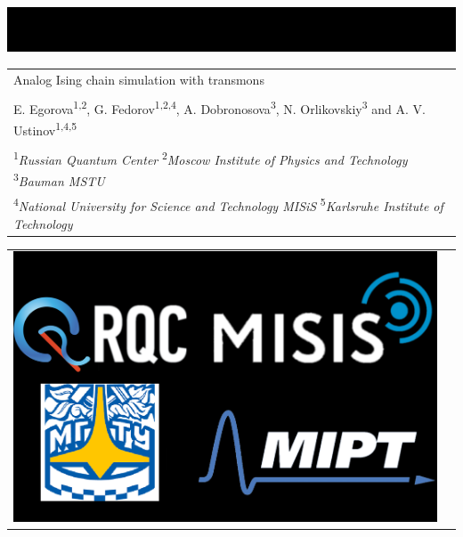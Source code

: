 \documentclass[a0, portrait]{a0poster}
\begin{document}
\begin{center}
\vspace*{-2cm}
\hspace*{-2cm}\includegraphics[width=1.2\textwidth]{Black_Landscape}
\end{center}


\begin{minipage}{0.65\textwidth}					
\vspace{-11cm}
\begin{tabular}[t]{l}
{\color{headingcol}\fontsize{68}{70}\selectfont Analog Ising chain simulation with transmons}\\
\\
{\hspace{0.2cm} \color{white}\large  E. Egorova\textsuperscript{1,2}, G. Fedorov\textsuperscript{1,2,4}, A. Dobronosova\textsuperscript{3}, N. Orlikovskiy\textsuperscript{3} and A. V. Ustinov\textsuperscript{1,4,5}} \\
\\
{\hspace{0.2cm}\color{white}\large \hspace{0.5cm} \textsuperscript{1}\textit{Russian Quantum Center} \hspace{0.5cm} \textsuperscript{2}\textit{Moscow Institute of Physics and Technology} \hspace{0.5cm} 
\textsuperscript{3}\textit{Bauman MSTU} \hspace{0.5cm}}\\ 
{\color{white}\large \hspace{0.5cm}\textsuperscript{4}\textit{National University for Science and Technology MISiS} \hspace{0.5cm} 
\textsuperscript{5}\textit{Karlsruhe Institute of Technology}}
\end{tabular}
\end{minipage}
\hspace{19cm}
\begin{minipage}{0.2\textwidth}
\vspace{-11cm}
\begin{tabular}{c c}
\includegraphics[height=0.05\textheight]{log}
\end{tabular}
\end{minipage}
\end{document}

